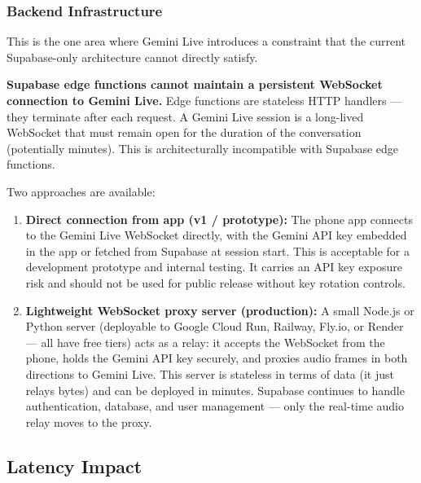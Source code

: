 \documentclass[12pt,a4paper]{article}
\begin{document}
\subsubsection{Backend Infrastructure}

This is the one area where Gemini Live introduces a constraint that the current Supabase-only
architecture cannot directly satisfy.

\begin{constraintbox}
\textbf{Supabase edge functions cannot maintain a persistent WebSocket connection to Gemini
Live.} Edge functions are stateless HTTP handlers — they terminate after each request. A
Gemini Live session is a long-lived WebSocket that must remain open for the duration of the
conversation (potentially minutes). This is architecturally incompatible with Supabase edge
functions.
\end{constraintbox}

Two approaches are available:

\begin{enumerate}
  \item \textbf{Direct connection from app (v1 / prototype):} The phone app connects to the
        Gemini Live WebSocket directly, with the Gemini API key embedded in the app or fetched
        from Supabase at session start. This is acceptable for a development prototype and
        internal testing. It carries an API key exposure risk and should not be used for
        public release without key rotation controls.

  \item \textbf{Lightweight WebSocket proxy server (production):} A small Node.js or Python
        server (deployable to Google Cloud Run, Railway, Fly.io, or Render — all have free
        tiers) acts as a relay: it accepts the WebSocket from the phone, holds the Gemini API
        key securely, and proxies audio frames in both directions to Gemini Live. This server
        is stateless in terms of data (it just relays bytes) and can be deployed in minutes.
        Supabase continues to handle authentication, database, and user management — only the
        real-time audio relay moves to the proxy.
\end{enumerate}

\subsection{Latency Impact}
\end{document}
